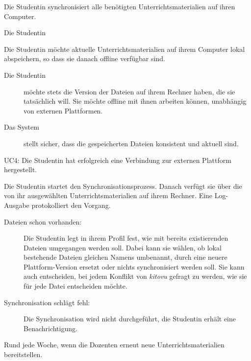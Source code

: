\documentclass[a4paper]{article}
\begin{document}
\begin{description}[uclist]
	\item[Goal] Die Studentin synchronisiert alle benötigten Unterrichtsmaterialien auf ihren Computer.
	\item[Primary Actor] Die Studentin
	\item[Trigger] Die Studentin möchte aktuelle Unterrichtsmaterialien auf ihrem Computer lokal abspeichern, so dass sie danach offline verfügbar sind.
	\item[Stakeholders and Interests]
	\begin{description}
		\item[Die Studentin] möchte stets die Version der Dateien auf ihrem Rechner haben, die sie tatsächlich will. Sie möchte offline mit ihnen arbeiten können, unabhängig von externen Plattformen.
		\item[Das System] stellt sicher, dass die gespeicherten Dateien konsistent und aktuell sind.
	\end{description}
	\item[Preconditions] UC4: Die Studentin hat erfolgreich eine Verbindung zur externen Plattform hergestellt.
	\item[Main Success Scenario] Die Studentin startet den Synchronisationsprozess. Danach verfügt sie über die von ihr ausgewählten Unterrichtsmaterialien auf ihrem Rechner. Eine Log-Ausgabe protokolliert den Vorgang.
	\item[Extensions]
	\begin{description}
		\item[Dateien schon vorhanden:] Die Studentin legt in ihrem Profil fest, wie mit bereits existierenden Dateien umgegangen werden soll. Dabei kann sie wählen, ob lokal bestehende Dateien gleichen Namens umbenannt, durch eine neuere Plattform-Version ersetzt oder nichts synchronisiert werden soll. Sie kann auch entscheiden, bei jedem Konflikt von \emph{kitovu} gefragt zu werden, wie sie für jede Datei entscheiden möchte.
		\item[Synchronisation schlägt fehl:] Die Synchronisation wird nicht durchgeführt, die Studentin erhält eine Benachrichtigung.
	\end{description}
	\item[Frequency of Occurrence] Rund jede Woche, wenn die Dozenten erneut neue Unterrichtsmaterialien bereitstellen.
\end{description}
\end{document}
